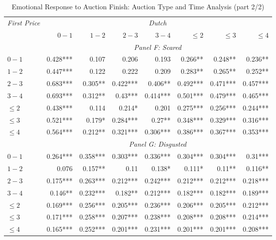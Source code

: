 \documentclass[]{article}
\begin{document}
\begin{table}[!htb] 

\caption{Emotional Response to Auction Finish: Auction Type and Time Analysis (part 2/2)} 

\label{tab:emotionalResponse} 

\centering 

\begingroup 

\scriptsize 

\begin{tabular}{lrrrrrrr} 

\toprule
\emph{First Price} & \multicolumn{7}{c}{\emph{Dutch}} \\ 

\cmidrule(lr){2-8} 
 & $0-1$ & $1-2$ & $2-3$ & $3-4$ & $\leq 2$ & $\leq 3$ & $\leq 4$ \\ 

\cmidrule(lr){2-8} 

& \multicolumn{7}{c}{\emph{Panel F: Scared}}\\ 

\cmidrule(lr){1-1} \cmidrule(lr){2-8}
$0-1$ & 0.428***  & 0.107     & 0.206     & 0.193     & 0.266**   & 0.248**   & 0.236**   \\ 
  $1-2$ & 0.447***  & 0.122     & 0.222     & 0.209     & 0.283**   & 0.265**   & 0.252**   \\ 
  $2-3$ & 0.683***  & 0.305**   & 0.422***  & 0.406**   & 0.492***  & 0.471***  & 0.457***  \\ 
  $3-4$ & 0.693***  & 0.312**   & 0.43***   & 0.414***  & 0.501***  & 0.479***  & 0.465***  \\ 
$\leq 2$ & 0.438***  & 0.114     & 0.214*    & 0.201     & 0.275***  & 0.256***  & 0.244***  \\ 
$\leq 3$ & 0.521***  & 0.179*    & 0.284***  & 0.27**    & 0.348***  & 0.329***  & 0.316***  \\ 
$\leq 4$ & 0.564***  & 0.212**   & 0.321***  & 0.306***  & 0.386***  & 0.367***  & 0.353***  \\ 
\cmidrule(lr){2-8} 

& \multicolumn{7}{c}{\emph{Panel G: Disgusted}}\\ 

\cmidrule(lr){1-1} \cmidrule(lr){2-8}
$0-1$ & 0.264***  & 0.358***  & 0.303***  & 0.336***  & 0.304***  & 0.304***  & 0.31***   \\ 
  $1-2$ & 0.076     & 0.157**   & 0.11      & 0.138*    & 0.111*    & 0.11**    & 0.116**   \\ 
  $2-3$ & 0.175***  & 0.263***  & 0.212***  & 0.242***  & 0.212***  & 0.212***  & 0.218***  \\ 
  $3-4$ & 0.146**   & 0.232***  & 0.182**   & 0.212***  & 0.182***  & 0.182***  & 0.189***  \\ 
$\leq 2$ & 0.169***  & 0.256***  & 0.205***  & 0.236***  & 0.206***  & 0.205***  & 0.212***  \\ 
$\leq 3$ & 0.171***  & 0.258***  & 0.207***  & 0.238***  & 0.208***  & 0.208***  & 0.214***  \\ 
$\leq 4$ & 0.165***  & 0.252***  & 0.201***  & 0.231***  & 0.201***  & 0.201***  & 0.208***  \\ 
\cmidrule(lr){2-8} 


\end{tabular}
\end{table}
\end{document}
